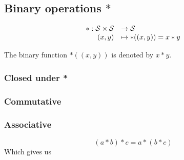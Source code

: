 \documentclass[a4paper,11pt]{kth-mag}
\renewcommand{\SS}{\ensuremath{\mathcal{S}}}
\begin{document}
\subsection{Binary operations $*$}
\begin{equation}
     \begin{array}{r l}
         * : \SS \times \SS &\rightarrow \SS \\
                       (x,y)&\mapsto *((x,y))=x*y
     \end{array}
\end{equation}

The binary function $*((x,y))$ is denoted by $x*y$.

\subsubsection{Closed under *}

\subsubsection{Commutative}

\subsubsection{Associative}
\begin{equation}
    (a*b)*c = a*(b*c)
\end{equation}
Which gives us 
\end{document}
